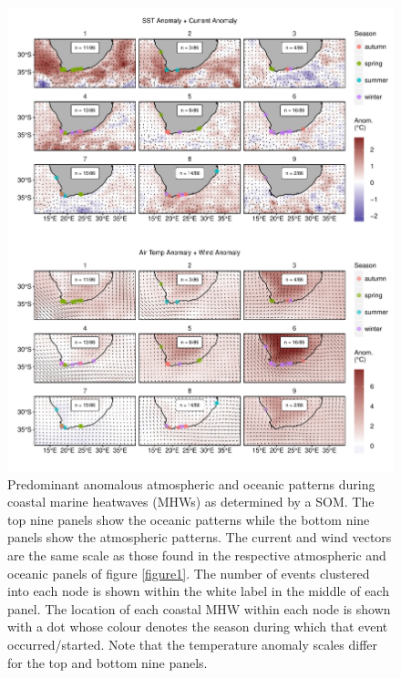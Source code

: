 \documentclass[utf8]{frontiersSCNS}
\begin{document}
\begin{figure}[]
\begin{center}
\includegraphics[width=1.0\textwidth]{figure_4.pdf}
\end{center}
\caption{Predominant anomalous atmospheric and oceanic patterns during coastal marine heatwaves (MHWs) as determined by a SOM. The top nine panels show the oceanic patterns while the bottom nine panels show the atmospheric patterns. The current and wind vectors are the same scale as those found in the respective atmospheric and oceanic panels of figure \ref{figure1}. The number of events clustered into each node is shown within the white label in the middle of each panel. The location of each coastal MHW within each node is shown with a dot whose colour denotes the season during which that event occurred/started. Note that the temperature anomaly scales differ for the top and bottom nine panels.}
\label{figure4}
\end{figure}
\end{document}
